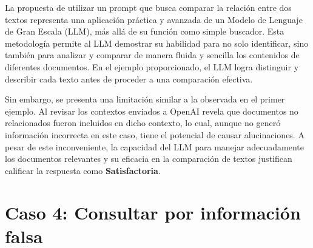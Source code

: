 La propuesta de utilizar un prompt que busca comparar la relación entre dos textos representa una aplicación práctica y avanzada de un Modelo de 
Lenguaje de Gran Escala (LLM), más allá de su función como simple buscador. Esta metodología permite al LLM demostrar su habilidad para no solo 
identificar, sino también para analizar y comparar de manera fluida y sencilla los contenidos de diferentes documentos. En el ejemplo proporcionado, 
el LLM logra distinguir y describir cada texto antes de proceder a una comparación efectiva.

Sin embargo, se presenta una limitación similar a la observada en el primer ejemplo. Al revisar los contextos enviados a OpenAI revela que documentos
no relacionados fueron incluidos en dicho contexto, lo cual, aunque no generó información incorrecta en este caso, tiene el potencial de causar 
alucinaciones. A pesar de este inconveniente, la capacidad del LLM para manejar adecuadamente los documentos relevantes y su eficacia en la 
comparación de textos justifican calificar la respuesta como \textbf{Satisfactoria}.

\newpage

\section{Caso 4: Consultar por información falsa}


